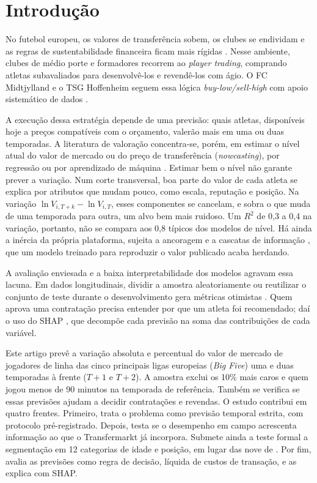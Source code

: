 \documentclass[article, 12pt, oneside, a4paper, english, brazil, section=TITLE]{abntex2}
\begin{document}
\section{Introdução}

No futebol europeu, os valores de transferência sobem, os clubes se endividam e as regras de sustentabilidade financeira ficam mais rígidas \cite{hill2026}.
Nesse ambiente, clubes de médio porte e formadores recorrem ao \textit{player trading}, comprando atletas subavaliados para desenvolvê-los e revendê-los com ágio.
O FC Midtjylland e o TSG Hoffenheim seguem essa lógica \textit{buy-low/sell-high} com apoio sistemático de dados \cite{muller2017}.

A execução dessa estratégia depende de uma previsão: quais atletas, disponíveis hoje a preços compatíveis com o orçamento, valerão mais em uma ou duas temporadas.
A literatura de valoração concentra-se, porém, em estimar o nível atual do valor de mercado ou do preço de transferência (\textit{nowcasting}), por regressão \cite{muller2017} ou por aprendizado de máquina \cite{mchale2023,khalife2025}.
Estimar bem o nível não garante prever a variação.
Num corte transversal, boa parte do valor de cada atleta se explica por atributos que mudam pouco, como escala, reputação e posição.
Na variação $\ln V_{i,T+k} - \ln V_{i,T}$, esses componentes se cancelam, e sobra o que muda de uma temporada para outra, um alvo bem mais ruidoso.
Um $R^2$ de 0,3 a 0,4 na variação, portanto, não se compara aos 0,8 típicos dos modelos de nível.
Há ainda a inércia da própria plataforma, sujeita a ancoragem e a cascatas de informação \cite{herm2014,coates2022}, que um modelo treinado para reproduzir o valor publicado acaba herdando.

A avaliação enviesada e a baixa interpretabilidade dos modelos agravam essa lacuna.
Em dados longitudinais, dividir a amostra aleatoriamente ou reutilizar o conjunto de teste durante o desenvolvimento gera métricas otimistas \cite{kaufman2011,kapoor2023}.
Quem aprova uma contratação precisa entender por que um atleta foi recomendado; daí o uso do SHAP \cite{lundberg2017}, que decompõe cada previsão na soma das contribuições de cada variável.

Este artigo prevê a variação absoluta e percentual do valor de mercado de jogadores de linha das cinco principais ligas europeias (\textit{Big Five}) uma e duas temporadas à frente ($T+1$ e $T+2$).
A amostra exclui os 10\% mais caros e quem jogou menos de 90 minutos na temporada de referência.
Também se verifica se essas previsões ajudam a decidir contratações e revendas.
O estudo contribui em quatro frentes.
Primeiro, trata o problema como previsão temporal estrita, com protocolo pré-registrado.
Depois, testa se o desempenho em campo acrescenta informação ao que o Transfermarkt já incorpora.
Submete ainda a teste formal a segmentação em 12 categorias de idade e posição, em lugar das nove de \textcite{khalife2025}.
Por fim, avalia as previsões como regra de decisão, líquida de custos de transação, e as explica com SHAP.
\end{document}
